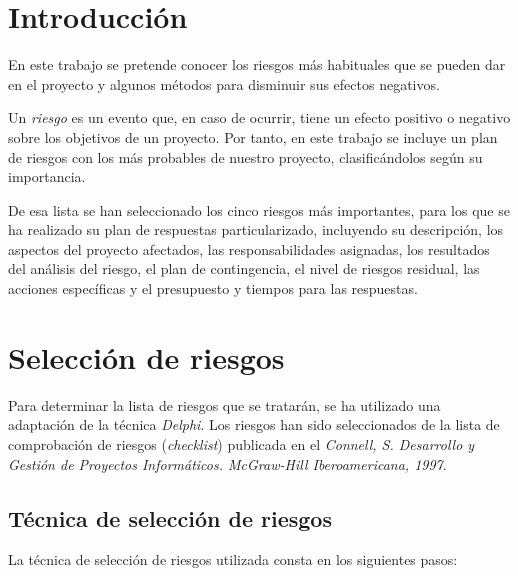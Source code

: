 \documentclass[11pt,a4paper,spanish,twoside]{book}
\begin{document}
\tableofcontents
\listoftables

\chapter*{Introducción}
En este trabajo se pretende conocer los riesgos más habituales que se pueden 
dar en el proyecto y algunos métodos para disminuir sus efectos negativos.

Un \emph{riesgo} es un evento que, en caso de ocurrir, tiene un efecto
positivo o negativo sobre los objetivos de un proyecto. Por tanto, en este
trabajo se incluye un plan de riesgos con los más probables de nuestro
proyecto, clasificándolos según su importancia.

De esa lista se han seleccionado los cinco riesgos más importantes, para los
que se ha realizado su plan de respuestas particularizado, incluyendo su 
descripción, los aspectos del proyecto afectados, las responsabilidades 
asignadas, los resultados del análisis del riesgo, el plan de contingencia,
el nivel de riesgos residual, las acciones específicas y el presupuesto y 
tiempos para las respuestas.

\chapter{Selección de riesgos}
Para determinar la lista de riesgos que se tratarán, se ha utilizado una
adaptación de la técnica \emph{Delphi}. Los riesgos han sido seleccionados de
la lista de comprobación de riesgos (\emph{checklist}) publicada en el 
\emph{Connell, S. Desarrollo y Gestión de Proyectos Informáticos. McGraw-Hill
Iberoamericana, 1997}.

\section{Técnica de selección de riesgos}
La técnica de selección de riesgos utilizada consta en los siguientes pasos:
\end{document}
